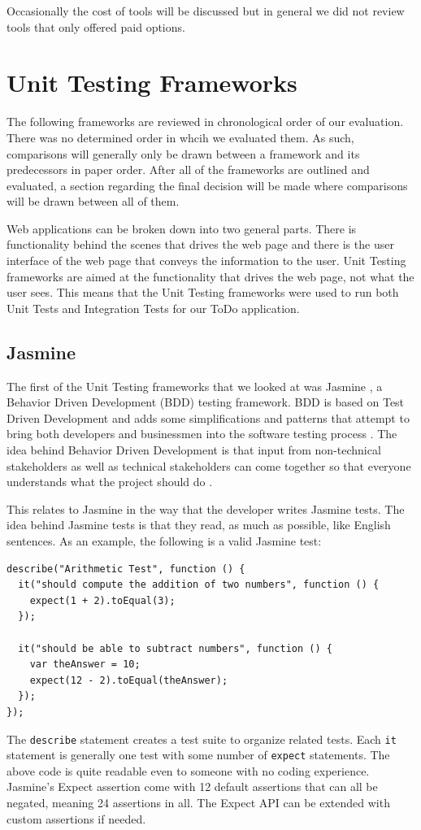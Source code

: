 \documentclass[12pt]{ucthesis}
\begin{document}
Occasionally the cost of tools will be discussed but in general we did not review tools that only offered paid options.

\section{Unit Testing Frameworks}
The following frameworks are reviewed in chronological order of our evaluation. There was no determined order in whcih we evaluated them. As such, comparisons will generally only be drawn between a framework and its predecessors in paper order. After all of the frameworks are outlined and evaluated, a section regarding the final decision will be made where comparisons will be drawn between all of them. 

Web applications can be broken down into two general parts. There is functionality behind the scenes that drives the web page and there is the user interface of the web page that conveys the information to the user. Unit Testing frameworks are aimed at the functionality that drives the web page, not what the user sees. This means that the Unit Testing frameworks were used to run both Unit Tests and Integration Tests for our ToDo application.

\subsection{Jasmine}
The first of the Unit Testing frameworks that we looked at was Jasmine \cite{Jasmine}, a Behavior Driven Development (BDD) testing framework. BDD is based on Test Driven Development and adds some simplifications and patterns that attempt to bring both developers and businessmen into the software testing process \cite{BDD}. The idea behind Behavior Driven Development is that input from non-technical stakeholders as well as technical stakeholders can come together so that everyone understands what the project should do \cite{BDD}.

This relates to Jasmine in the way that the developer writes Jasmine tests. The idea behind Jasmine tests is that they read, as much as possible, like English sentences. As an example, the following is a valid Jasmine test:
\begin{lstlisting}
describe("Arithmetic Test", function () {
  it("should compute the addition of two numbers", function () {
    expect(1 + 2).toEqual(3);
  });

  it("should be able to subtract numbers", function () {
    var theAnswer = 10;
    expect(12 - 2).toEqual(theAnswer);
  });
});
\end{lstlisting}
The \lstinline{describe} statement creates a test suite to organize related tests. Each \lstinline{it} statement is generally one test with some number of \lstinline{expect} statements. The above code is quite readable even to someone with no coding experience. Jasmine's Expect assertion come with 12 default assertions that can all be negated, meaning 24 assertions in all. The Expect API can be extended with custom assertions if needed.
\end{document}
